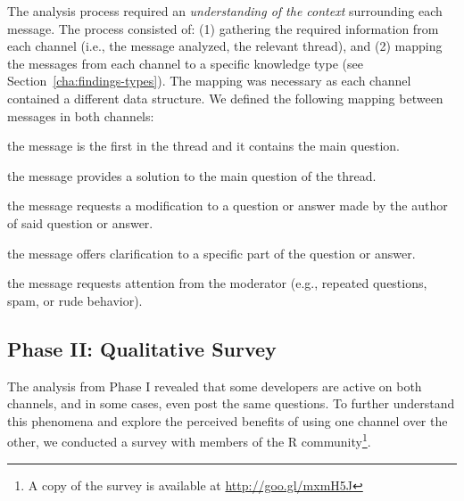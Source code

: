 
The analysis process required an \textit{understanding of the context} surrounding each message. The process consisted of: (1) gathering the required information from each channel (i.e., the message analyzed, the relevant thread), and (2) mapping the messages from each channel to a specific knowledge type (see Section~\ref{cha:findings-types}). The mapping was necessary as each channel contained a different data structure.
We defined the following mapping between messages in both channels:

	\begin{description}[itemsep=1pt, topsep=2pt, leftmargin=1em, parsep=0pt]
		\item[Question:] the message is the first in the thread and it contains the main question.
		\item[Answer:] the message provides a solution to the main question of the thread.
	 	\item[Update:] the message requests a modification to a question or answer made by the author of said question or answer.
		\item[Comment:] the message offers clarification to a specific part of the question or answer.
		\item[Flag:] the message requests attention from the moderator (e.g., repeated questions, spam, or rude behavior).
	\end{description}


\subsection{Phase II: Qualitative Survey}

The analysis from Phase I revealed that some developers are active on both channels, and in some cases, even post the same questions. To further understand this phenomena and explore the perceived benefits of using one channel over the other, we conducted a survey with members of the R community\footnote{A copy of the survey is available at \url{http://goo.gl/mxmH5J}}. %

